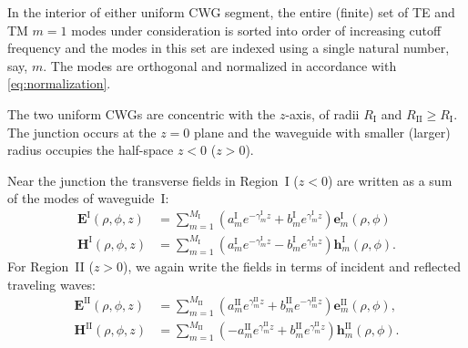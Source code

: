 \documentclass[11pt]{article}
\newcommand{\E}{\boldsymbol{E}}
\newcommand{\EI}{\E^{\text{I}}}
\newcommand{\EII}{\E^{\text{II}}}
\renewcommand{\H}{\boldsymbol{H}}
\newcommand{\HI}{\H^{\text{I}}}
\newcommand{\HII}{\H^{\text{II}}}
\newcommand{\e}{\boldsymbol{e}}
\newcommand{\h}{\boldsymbol{h}}
\newcommand{\I}{\ensuremath{\text{I}}}
\newcommand{\II}{\ensuremath{\text{II}}}
\newcommand{\eI}{\e^{\text{I}}}
\newcommand{\eII}{\e^{\text{II}}}
\newcommand{\hI}{\h^{\text{I}}}
\newcommand{\hII}{\h^{\text{II}}}
\newcommand{\MI}{M_{\text{I}}}
\newcommand{\MII}{M_{\text{II}}}
\newcommand{\aI}{a^{\text{I}}}
\newcommand{\aII}{a^{\text{II}}}
\newcommand{\bI}{b^{\text{I}}}
\newcommand{\bII}{b^{\text{II}}}
\newcommand{\gammaI}{\gamma^{\text{I}}}
\newcommand{\gammaII}{\gamma^{\text{II}}}
\begin{document}
In the interior of either uniform CWG segment, the entire (finite) set of
TE and TM $m=1$ modes under consideration is sorted into order of
increasing cutoff frequency and the modes in this set are indexed using
a single natural number, say, $m$.
The modes are orthogonal and normalized in accordance with
\eqref{eq:normalization}. 


The two uniform CWGs are concentric
with the $z$-axis, of radii $R_{\I}$ and $R_{\II} \ge R_{\I}$.  The
junction occurs at the $z=0$ plane and the waveguide with smaller
(larger) radius occupies the half-space $z<0$ ($z>0$). 

Near the junction the transverse fields in Region~I ($z<0$) are
written as a sum of the modes of waveguide~I:
\begin{subequations}
\label{eq:13}
  \begin{align}
    \EI(\rho,\phi,z) &= \sum_{m=1}^{\MI} (\aI_m e^{-\gammaI_m z} + \bI_m
    e^{\gammaI_m z})  \eI_m(\rho,\phi) \\
    \HI(\rho,\phi,z) &= \sum_{m=1}^{\MI} (\aI_m e^{-\gammaI_m z} - \bI_m
    e^{\gammaI_m z})  \hI_m(\rho,\phi).
  \end{align}
\end{subequations}
For Region~II ($z>0$), we again write the fields in terms of incident and
reflected traveling waves:
\begin{subequations}
\label{eq:14}
\begin{align}
    \EII(\rho,\phi,z) &= \sum_{m=1}^{\MII} (\aII_m e^{\gammaII_m z} + \bII_m
    e^{-\gammaII_m z})  \eII_m(\rho,\phi), \\
    \HII(\rho,\phi,z) &= \sum_{m=1}^{\MII} (-\aII_m e^{\gammaII_m z} + \bII_m
    e^{\gammaII_m z})  \hII_m(\rho,\phi).
  \end{align}
\end{subequations}
\end{document}

